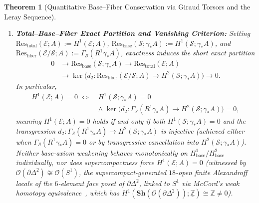 \documentclass[10pt,twoside,openright]{book}
\theoremstyle{crmplain}
\newtheorem{theorem}{Theorem}[section]
\theoremstyle{crmdef}
\theoremstyle{crmremark}
\begin{document}
\begin{theorem}[Quantitative Base--Fiber Conservation via Giraud Torsors and the Leray Sequence]
\begin{enumerate}[label=\textup{(\alph*)},leftmargin=2.0em]
  \item \textbf{Total--Base--Fiber Exact Partition and Vanishing Criterion:} Setting $\mathrm{Res}_{\mathrm{total}}(\mathcal{E}; A) := H^1(\mathcal{E}; A)$, $\mathrm{Res}_{\mathrm{base}}(\mathcal{S}; \gamma_* A) := H^1(\mathcal{S}; \gamma_* A)$, and $\mathrm{Res}_{\mathrm{fiber}}(\mathcal{E}/\mathcal{S}; A) := \Gamma_{\mathcal{S}}(R^1\gamma_* A)$, exactness induces the short exact partition
  \[
    \begin{aligned}
      0 &\longrightarrow \mathrm{Res}_{\mathrm{base}}(\mathcal{S}; \gamma_* A) \longrightarrow \mathrm{Res}_{\mathrm{total}}(\mathcal{E}; A) \\
      &\longrightarrow \ker\bigl(d_2 : \mathrm{Res}_{\mathrm{fiber}}(\mathcal{E}/\mathcal{S}; A) \to H^2(\mathcal{S}; \gamma_* A)\bigr) \longrightarrow 0.
    \end{aligned}
  \]
  In particular,
  \[
    \begin{aligned}
      H^1(\mathcal{E}; A) = 0 \;\iff\;& H^1(\mathcal{S}; \gamma_* A) = 0 \\
      &\wedge\; \ker\bigl(d_2 : \Gamma_{\mathcal{S}}(R^1\gamma_* A) \to H^2(\mathcal{S}; \gamma_* A)\bigr) = 0,
    \end{aligned}
  \]
  meaning $H^1(\mathcal{E}; A) = 0$ holds if and only if \emph{both} $H^1(\mathcal{S}; \gamma_* A) = 0$ and the transgression $d_2 : \Gamma_{\mathcal{S}}(R^1\gamma_* A) \to H^2(\mathcal{S}; \gamma_* A)$ is injective (achieved either when $\Gamma_{\mathcal{S}}(R^1\gamma_* A) = 0$ or by transgressive cancellation into $H^2(\mathcal{S}; \gamma_* A)$). Neither base-axiom weakening behaves monotonically on $H^1_{\mathrm{base}}/H^2_{\mathrm{base}}$ individually, nor does supercompactness force $H^1(\mathcal{E}; A) = 0$ (witnessed by $\mathcal{O}(\partial\Delta^2) \not\cong \mathcal{O}(S^1)$, the supercompact-generated $18$-open finite Alexandroff locale of the $6$-element face poset of $\partial\Delta^2$, linked to $S^1$ via McCord's weak homotopy equivalence~\cite[Theorem~1]{McCord66}, which has $H^1(\mathbf{Sh}(\mathcal{O}(\partial\Delta^2)); \underline{\mathbb{Z}}) \cong \mathbb{Z} \neq 0$).

\end{enumerate}

\end{theorem}
\end{document}
